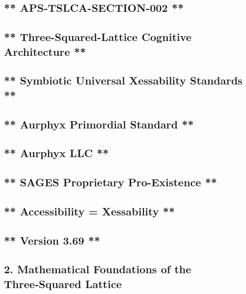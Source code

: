 \subsection{** APS‑TSLCA-SECTION-002 **}\label{apstslca-section-002}

\subsection{** Three-Squared-Lattice Cognitive Architecture **}\label{three-squared-lattice-cognitive-architecture}

\subsection{** Symbiotic Universal Xessability Standards **}\label{symbiotic-universal-xessability-standards}

\subsection{** Aurphyx Primordial Standard **}\label{aurphyx-primordial-standard}

\subsection{** Aurphyx LLC **}\label{aurphyx-llc}

\subsection{** SAGES \textbar{} Proprietary \textbar{} Pro-Existence **}\label{sages-proprietary-pro-existence}

\subsection{** Accessibility = Xessability **}\label{accessibility-xessability}

\subsection{** Version 3.69 **}\label{version-3.69}

\subsection{2. Mathematical Foundations of the Three‑Squared Lattice}\label{mathematical-foundations-of-the-threesquared-lattice}

